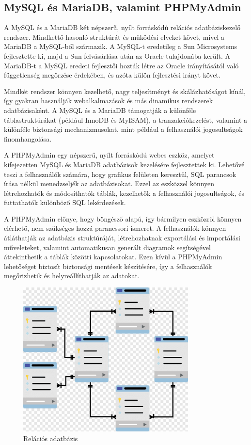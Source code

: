 \documentclass[colorlinks]{thesis-kando}
\theoremstyle{definition}
\theoremstyle{remark}
\begin{document}
\subsection{MySQL és MariaDB, valamint PHPMyAdmin}

A MySQL és a MariaDB két népszerű, nyílt forráskódú relációs adatbáziskezelő rendszer. Mindkettő hasonló struktúrát és működési elveket követ, mivel a MariaDB a MySQL-ből származik. A MySQL-t eredetileg a Sun Microsystems fejlesztette ki, majd a Sun felvásárlása után az Oracle tulajdonába került. A MariaDB-t a MySQL eredeti fejlesztői hozták létre az Oracle irányításától való függetlenség megőrzése érdekében, és azóta külön fejlesztési irányt követ.

Mindkét rendszer könnyen kezelhető, nagy teljesítményt és skálázhatóságot kínál, így gyakran használják webalkalmazások és más dinamikus rendszerek adatbázisaként. A MySQL és a MariaDB támogatják a különféle táblastruktúrákat (például InnoDB és MyISAM), a tranzakciókezelést, valamint a különféle biztonsági mechanizmusokat, mint például a felhasználói jogosultságok finomhangolása.

A PHPMyAdmin egy népszerű, nyílt forráskódú webes eszköz, amelyet kifejezetten MySQL és MariaDB adatbázisok kezelésére fejlesztettek ki. Lehetővé teszi a felhasználók számára, hogy grafikus felületen keresztül, SQL parancsok írása nélkül menedzseljék az adatbázisokat. Ezzel az eszközzel könnyen létrehozhatók és módosíthatók táblák, kezelhetők a felhasználói jogosultságok, és futtathatók különböző SQL lekérdezések.

A PHPMyAdmin előnye, hogy böngésző alapú, így bármilyen eszközről könnyen elérhető, nem szükséges hozzá parancssori ismeret. A felhasználók könnyen átláthatják az adatbázis struktúráját, létrehozhatnak exportálási és importálási műveleteket, valamint automatikusan generált diagramok segítségével áttekinthetik a táblák közötti kapcsolatokat. Ezen kívül a PHPMyAdmin lehetőséget biztosít biztonsági mentések készítésére, így a felhasználók megőrizhetik és helyreállíthatják az adatokat.

\begin{figure}[ht!]
    \centering
    \includegraphics[width=9cm]{figures/rdb.png}
    \caption[dotNET]{Relációs adatbázis}
\end{figure}
\pagebreak
\end{document}
